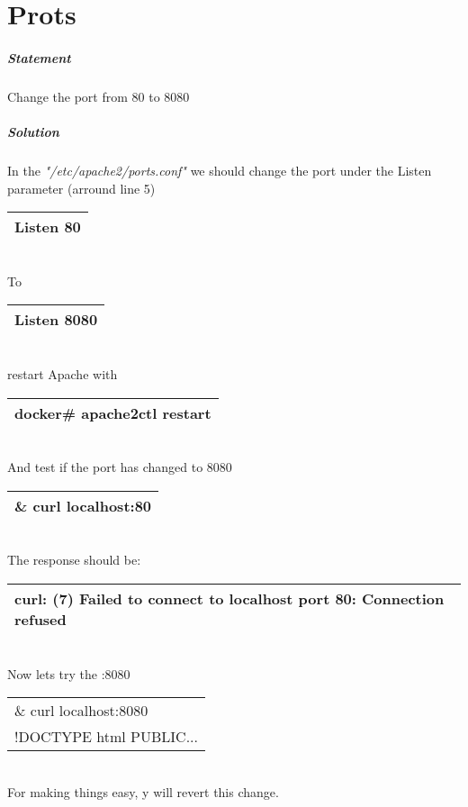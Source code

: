 \documentclass[a4paper,10pt]{article}
\begin{document}
\section{Prots}
\subparagraph{Statement}
Change the port from 80 to 8080
\subparagraph{Solution}
In the {\it"/etc/apache2/ports.conf"} we should change the port under the Listen parameter (arround line 5)
\vspace{0.5cm}\\\begin{tabular}{|l|}\hline
Listen 80
\\\hline\end{tabular}\vspace{0.5cm}\\
To
\vspace{0.5cm}\\\begin{tabular}{|l|}\hline
Listen 8080
\\\hline\end{tabular}\vspace{0.5cm}\\
restart Apache with
\vspace{0.5cm}\\\begin{tabular}{|l|}\hline
docker\# apache2ctl restart
\\\hline\end{tabular}\vspace{0.5cm}\\
And test if the port has changed to 8080
\vspace{0.5cm}\\\begin{tabular}{|l|}\hline
\& curl localhost:80
\\\hline\end{tabular}\vspace{0.5cm}\\
The response should be:
\vspace{0.5cm}\\\begin{tabular}{|l|}\hline
curl: (7) Failed to connect to localhost port 80: Connection refused
\\\hline\end{tabular}\vspace{0.5cm}\\
Now lets try the :8080
\vspace{0.5cm}\\\begin{tabular}{|l|}\hline
\& curl localhost:8080\\
!DOCTYPE html PUBLIC...
\\\hline\end{tabular}\vspace{0.5cm}\\
For making things easy, y will revert this change.
\end{document}
